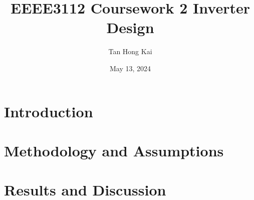 \documentclass[12pt]{article}
\title{EEEE3112 Coursework 2 Inverter Design}
\author{Tan Hong Kai}
\date{May 13, 2024}
\begin{document}
\maketitle

\section{Introduction}

\section{Methodology and Assumptions}

\section{Results and Discussion}
\end{document}
